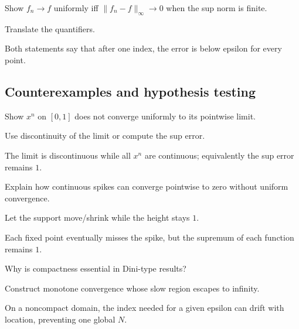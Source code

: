 \begin{exercise}\label{exr:ii11-expand-09}
Show \(f_n\to f\) uniformly iff \(\|f_n-f\|_\infty\to0\) when the sup norm is finite.
\end{exercise}
\begin{hint}
Translate the quantifiers.
\end{hint}
\begin{solution}
Both statements say that after one index, the error is below epsilon for every point.
\end{solution}

\subsection*{Counterexamples and hypothesis testing}

\begin{exercise}\label{exr:ii11-expand-10}
Show \(x^n\) on \([0,1]\) does not converge uniformly to its pointwise limit.
\end{exercise}
\begin{hint}
Use discontinuity of the limit or compute the sup error.
\end{hint}
\begin{solution}
The limit is discontinuous while all \(x^n\) are continuous; equivalently the sup error remains \(1\).
\end{solution}

\begin{exercise}\label{exr:ii11-expand-11}
Explain how continuous spikes can converge pointwise to zero without uniform convergence.
\end{exercise}
\begin{hint}
Let the support move/shrink while the height stays \(1\).
\end{hint}
\begin{solution}
Each fixed point eventually misses the spike, but the supremum of each function remains \(1\).
\end{solution}

\begin{exercise}\label{exr:ii11-expand-12}
Why is compactness essential in Dini-type results?
\end{exercise}
\begin{hint}
Construct monotone convergence whose slow region escapes to infinity.
\end{hint}
\begin{solution}
On a noncompact domain, the index needed for a given epsilon can drift with location, preventing one global \(N\).
\end{solution}


